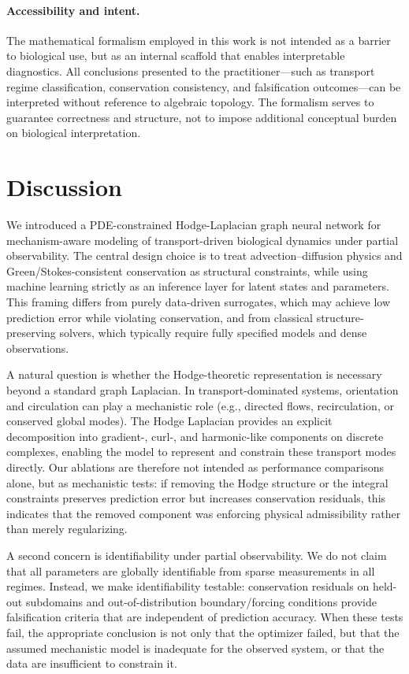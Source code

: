 \documentclass[10pt,article]{article}
\begin{document}
\paragraph{Accessibility and intent.}
The mathematical formalism employed in this work is not intended as a barrier to biological use, but as an internal scaffold that enables interpretable diagnostics. All conclusions presented to the practitioner—such as transport regime classification, conservation consistency, and falsification outcomes—can be interpreted without reference to algebraic topology. The formalism serves to guarantee correctness and structure, not to impose additional conceptual burden on biological interpretation.

\section{Discussion}

We introduced a PDE-constrained Hodge-Laplacian graph neural network for mechanism-aware modeling of transport-driven biological dynamics under partial observability. The central design choice is to treat advection--diffusion physics and Green/Stokes-consistent conservation as structural constraints, while using machine learning strictly as an inference layer for latent states and parameters. This framing differs from purely data-driven surrogates, which may achieve low prediction error while violating conservation, and from classical structure-preserving solvers, which typically require fully specified models and dense observations.

A natural question is whether the Hodge-theoretic representation is necessary beyond a standard graph Laplacian. In transport-dominated systems, orientation and circulation can play a mechanistic role (e.g., directed flows, recirculation, or conserved global modes). The Hodge Laplacian provides an explicit decomposition into gradient-, curl-, and harmonic-like components on discrete complexes, enabling the model to represent and constrain these transport modes directly. Our ablations are therefore not intended as performance comparisons alone, but as mechanistic tests: if removing the Hodge structure or the integral constraints preserves prediction error but increases conservation residuals, this indicates that the removed component was enforcing physical admissibility rather than merely regularizing.

A second concern is identifiability under partial observability. We do not claim that all parameters are globally identifiable from sparse measurements in all regimes. Instead, we make identifiability testable: conservation residuals on held-out subdomains and out-of-distribution boundary/forcing conditions provide falsification criteria that are independent of prediction accuracy. When these tests fail, the appropriate conclusion is not only that the optimizer failed, but that the assumed mechanistic model is inadequate for the observed system, or that the data are insufficient to constrain it.
\end{document}
